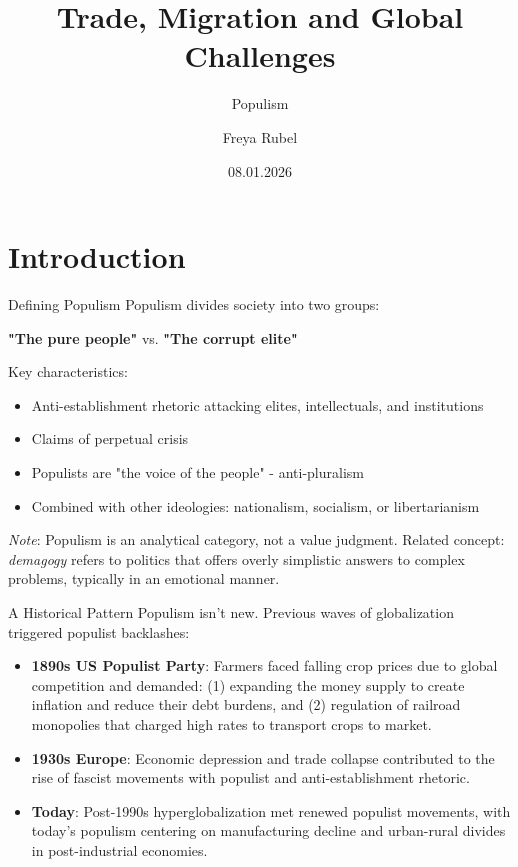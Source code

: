 \documentclass{beamer}
\author{Freya Rubel}
\title{Trade, Migration and Global Challenges}
\subtitle{Populism}
\institute{}
\date{08.01.2026}
\begin{document}
\begin{frame}
    \titlepage
\end{frame}

\begin{frame}
    \tableofcontents[sectionstyle=show, subsectionstyle=show/shaded/hide, subsubsectionstyle=show/shaded/hide]
\end{frame}


\section{Introduction}

\begin{frame}{Defining Populism}
Populism divides society into two groups:
\begin{center}
\textbf{"The pure people"} vs. \textbf{"The corrupt elite"}
\end{center}
\vspace{0.3cm}
Key characteristics:
\begin{itemize}
    \item Anti-establishment rhetoric attacking elites, intellectuals, and institutions
    \item Claims of perpetual crisis
    \item Populists are "the voice of the people" - anti-pluralism
    \item Combined with other ideologies: nationalism, socialism, or libertarianism
\end{itemize}
\vspace{0.3cm}
\textit{Note}: Populism is an analytical category, not a value judgment. Related concept: \textit{demagogy} refers to politics that offers overly simplistic answers to complex problems, typically in an emotional manner.
\end{frame}

\begin{frame}{A Historical Pattern}
Populism isn't new. Previous waves of globalization triggered populist backlashes:
\begin{itemize}
\item \textbf{1890s US Populist Party}: Farmers faced falling crop prices due to global competition and demanded: (1) expanding the money supply to create inflation and reduce their debt burdens, and (2) regulation of railroad monopolies that charged high rates to transport crops to market.
    \item \textbf{1930s Europe}: Economic depression and trade collapse contributed to the rise of fascist movements with populist and anti-establishment rhetoric.
\item \textbf{Today}: Post-1990s hyperglobalization met renewed populist movements, with today's populism centering on manufacturing decline and urban-rural divides in post-industrial economies.
\end{itemize}
\end{frame}
\end{document}
